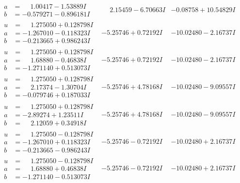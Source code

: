 \documentclass[1p]{elsarticle_modified}
\theoremstyle{definition}
\begin{document}
$$\begin{array}{c|c|c}
\begin{aligned}
a &= \phantom{-}1.00417 - 1.53889 I \\
b &= -0.579271 - 0.896181 I\end{aligned}
 & \phantom{-}2.15459 - 6.70663 I & -0.08758 + 10.54829 I \\ \hline\begin{aligned}
u &= \phantom{-}1.275050 + 0.128798 I \\
a &= -1.267010 - 0.118323 I \\
b &= -0.213665 + 0.986243 I\end{aligned}
 & -5.25746 + 0.72192 I & -10.02480 - 2.16737 I \\ \hline\begin{aligned}
u &= \phantom{-}1.275050 + 0.128798 I \\
a &= \phantom{-}1.68880 - 0.46838 I \\
b &= -1.271140 + 0.513073 I\end{aligned}
 & -5.25746 + 0.72192 I & -10.02480 - 2.16737 I \\ \hline\begin{aligned}
u &= \phantom{-}1.275050 + 0.128798 I \\
a &= \phantom{-}2.17374 - 1.30704 I \\
b &= -0.079746 + 0.187033 I\end{aligned}
 & -5.25746 + 4.78168 I & -10.02480 - 9.09557 I \\ \hline\begin{aligned}
u &= \phantom{-}1.275050 + 0.128798 I \\
a &= -2.89274 + 1.23511 I \\
b &= \phantom{-}2.12059 + 0.34918 I\end{aligned}
 & -5.25746 + 4.78168 I & -10.02480 - 9.09557 I \\ \hline\begin{aligned}
u &= \phantom{-}1.275050 - 0.128798 I \\
a &= -1.267010 + 0.118323 I \\
b &= -0.213665 - 0.986243 I\end{aligned}
 & -5.25746 - 0.72192 I & -10.02480 + 2.16737 I \\ \hline\begin{aligned}
u &= \phantom{-}1.275050 - 0.128798 I \\
a &= \phantom{-}1.68880 + 0.46838 I \\
b &= -1.271140 - 0.513073 I\end{aligned}
 & -5.25746 - 0.72192 I & -10.02480 + 2.16737 I \\ \hline\begin{aligned}

\end{aligned}
\end{array}$$
\end{document}

